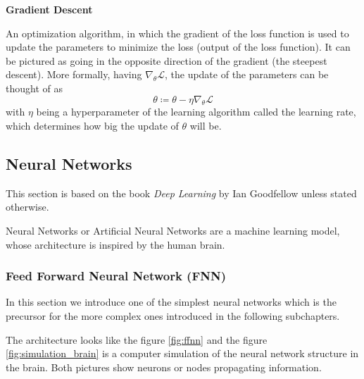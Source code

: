     \textbf{Gradient Descent}

    An optimization algorithm, in which the gradient of the loss function is used to update the parameters to minimize the loss (output of the loss function). It can be pictured as going in the opposite direction of the gradient (the steepest descent). More formally, having  $\nabla_\theta \mathcal{L}$, the update of the parameters can be thought of as 
    \begin{equation}
        \theta \coloneq \theta - \eta \nabla_\theta \mathcal{L}
    \end{equation}
    with \(\eta\) being a hyperparameter of the learning algorithm called the learning rate, which determines how big the update of $\theta$ will be.


    \subsection{Neural Networks}
    This section is based on the book \textit{Deep Learning} by Ian Goodfellow \cite{goodfellow2016deep} unless stated otherwise. 

    Neural Networks or Artificial Neural Networks are a machine learning model, whose architecture is inspired by the human brain.

    \subsubsection{Feed Forward Neural Network (FNN)}

    In this section we introduce one of the simplest neural networks which is the precursor for the more complex ones introduced in the following subchapters.
    
    The architecture looks like the figure \ref{fig:ffnn} and the figure \ref{fig:simulation_brain} is a computer simulation of the neural network structure in the brain. Both pictures show neurons or nodes propagating information.


